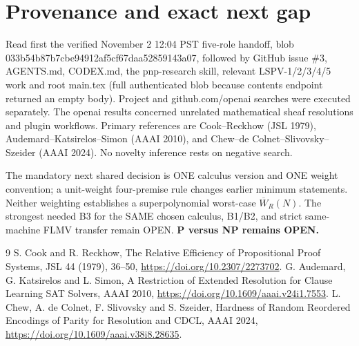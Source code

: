 \documentclass[11pt]{article}
\begin{document}
\section{Provenance and exact next gap}
Read first the verified November 2 12:04 PST five-role handoff, blob 033b54b87b7cbe94912af5cf67daa52859143a07, followed by GitHub issue \#3, AGENTS.md, CODEX.md, the pnp-research skill, relevant LSPV-1/2/3/4/5 work and root main.tex (full authenticated blob because contents endpoint returned an empty body). Project and github.com/openai searches were executed separately. The openai results concerned unrelated mathematical sheaf resolutions and plugin workflows. Primary references are Cook--Reckhow (JSL 1979), Audemard--Katsirelos--Simon (AAAI 2010), and Chew--de Colnet--Slivovsky--Szeider (AAAI 2024). No novelty inference rests on negative search.

The mandatory next shared decision is ONE calculus version and ONE weight convention; a unit-weight four-premise rule changes earlier minimum statements. Neither weighting establishes a superpolynomial worst-case $\overline W_R(N)$. The strongest needed B3 for the SAME chosen calculus, B1/B2, and strict same-machine FLMV transfer remain OPEN. \textbf{P versus NP remains OPEN.}
\begin{thebibliography}{9}
 S. Cook and R. Reckhow, The Relative Efficiency of Propositional Proof Systems, JSL 44 (1979), 36--50, \url{https://doi.org/10.2307/2273702}.
 G. Audemard, G. Katsirelos and L. Simon, A Restriction of Extended Resolution for Clause Learning SAT Solvers, AAAI 2010, \url{https://doi.org/10.1609/aaai.v24i1.7553}.
 L. Chew, A. de Colnet, F. Slivovsky and S. Szeider, Hardness of Random Reordered Encodings of Parity for Resolution and CDCL, AAAI 2024, \url{https://doi.org/10.1609/aaai.v38i8.28635}.
\end{thebibliography}
\end{document}

